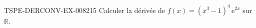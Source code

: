 \begin{exercice}{TSPE-DERCONV-EX-008}{2}{15}
Calculer la dérivée de $f(x) = (x^3 - 1)^4 \, \mathrm{e}^{2x}$ sur $\mathbb{R}$.

\end{exercice}
